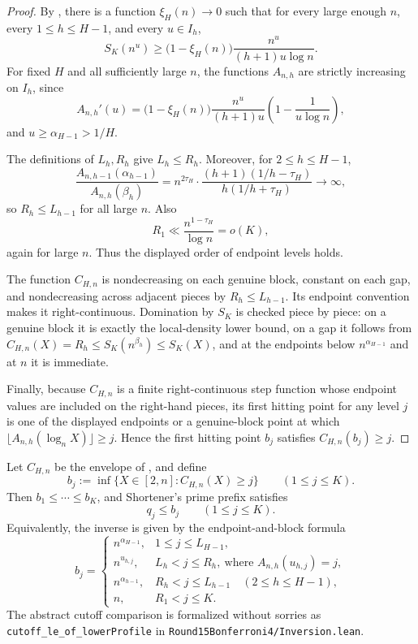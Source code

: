 \begin{proof}
By , there is a function $\xi_H(n)\to 0$ such that
for every large enough $n$, every $1\le h\le H-1$, and every $u\in I_h$,
\[
  S_K(n^u)
  \ge
  \bigl(1-\xi_H(n)\bigr)\frac{n^u}{(h+1)u\log n}.
\]
For fixed $H$ and all sufficiently large $n$, the functions $A_{n,h}$ are
strictly increasing on $I_h$, since
\[
  A_{n,h}'(u)
  =
  \bigl(1-\xi_H(n)\bigr)\frac{n^u}{(h+1)u}
  \left(1-\frac{1}{u\log n}\right),
\]
and $u\ge \alpha_{H-1}>1/H$.

The definitions of $L_h,R_h$ give $L_h\le R_h$.  Moreover, for
$2\le h\le H-1$,
\[
  \frac{A_{n,h-1}(\alpha_{h-1})}{A_{n,h}(\beta_h)}
  =
  n^{2\tau_H}\cdot
  \frac{(h+1)(1/h-\tau_H)}{h(1/h+\tau_H)}
  \to \infty,
\]
so $R_h\le L_{h-1}$ for all large $n$.  Also
\[
  R_1 \ll \frac{n^{1-\tau_H}}{\log n}=o(K),
\]
again for large $n$.  Thus the displayed order of endpoint levels holds.

The function $C_{H,n}$ is nondecreasing on each genuine block, constant on
each gap, and nondecreasing across adjacent pieces by $R_h\le L_{h-1}$.  Its
endpoint convention makes it right-continuous.  Domination by $S_K$ is checked
piece by piece: on a genuine block it is exactly the local-density lower bound,
on a gap it follows from $C_{H,n}(X)=R_h\le S_K(n^{\beta_h})\le S_K(X)$, and at
the endpoints below $n^{\alpha_{H-1}}$ and at $n$ it is immediate.

Finally, because $C_{H,n}$ is a finite right-continuous step function whose
endpoint values are included on the right-hand pieces, its first hitting point
for any level $j$ is one of the displayed endpoints or a genuine-block point at
which $\lfloor A_{n,h}(\log_n X)\rfloor\ge j$.  Hence the first hitting point
$b_j$ satisfies $C_{H,n}(b_j)\ge j$.
\end{proof}

\begin{lemma}
\label{lem:generalized-inverse-comparison}
Let $C_{H,n}$ be the envelope of
, and define
\[
  b_j := \inf\{X\in[2,n]: C_{H,n}(X)\ge j\}
  \qquad (1\le j\le K).
\]
Then $b_1\le\cdots\le b_K$, and Shortener's prime prefix satisfies
\[
  q_j\le b_j\qquad(1\le j\le K).
\]
Equivalently, the inverse is given by the endpoint-and-block formula
\[
  b_j=
  \begin{cases}
  n^{\alpha_{H-1}},&1\le j\le L_{H-1},\\[1mm]
  n^{u_{h,j}},&L_h<j\le R_h,\ \text{where }A_{n,h}(u_{h,j})=j,\\[1mm]
  n^{\alpha_{h-1}},&R_h<j\le L_{h-1}\quad(2\le h\le H-1),\\[1mm]
  n,&R_1<j\le K.
  \end{cases}
\]
The abstract cutoff comparison is formalized without sorries as
\texttt{cutoff\_le\_of\_lowerProfile} in
\texttt{Round15Bonferroni4/Inversion.lean}.
\end{lemma}

